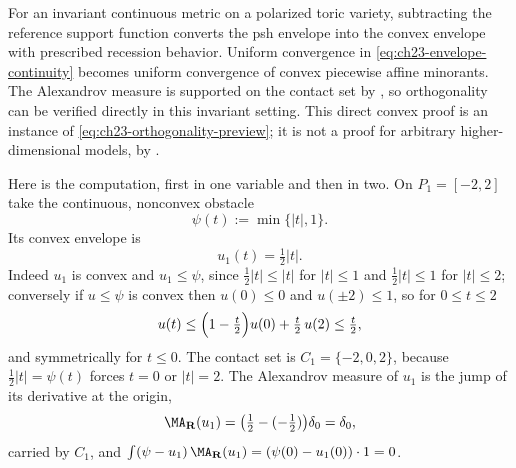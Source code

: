 \begin{example}
\label{ex:ch23-toric-orthogonality}
For an invariant continuous metric on a polarized toric variety, subtracting
the reference support function converts the psh envelope into the convex
envelope with prescribed recession behavior.  Uniform convergence in
\eqref{eq:ch23-envelope-continuity} becomes uniform convergence of convex
piecewise affine minorants.  The Alexandrov measure is supported on the
contact set by , so
orthogonality can be verified directly in this invariant setting.  This
direct convex proof is an instance of
\eqref{eq:ch23-orthogonality-preview}; it is not a proof for arbitrary
higher-dimensional models, by .

Here is the computation, first in one variable and then in two.  On
\(P_1=[-2,2]\) take the continuous, nonconvex obstacle
\[
 \psi(t):=\min\{|t|,1\} .
\]
Its convex envelope is
\[
 u_1(t)=\tfrac12|t| .
\]
Indeed \(u_1\) is convex and \(u_1\leq\psi\), since
\(\tfrac12|t|\leq|t|\) for \(|t|\leq1\) and \(\tfrac12|t|\leq1\) for
\(|t|\leq2\); conversely if \(u\leq\psi\) is convex then \(u(0)\leq0\) and
\(u(\pm2)\leq1\), so for \(0\leq t\leq2\)
\[
 u(t)\leq\Bigl(1-\tfrac t2\Bigr)u(0)+\tfrac t2\,u(2)\leq\tfrac t2 ,
\]
and symmetrically for \(t\leq0\).  The contact set is
\(C_1=\{-2,0,2\}\), because \(\tfrac12|t|=\psi(t)\) forces \(t=0\) or
\(|t|=2\).  The Alexandrov measure of \(u_1\) is the jump of its derivative
at the origin,
\[
 \MA_{\mathbf R}(u_1)=\bigl(\tfrac12-(-\tfrac12)\bigr)\delta_0=\delta_0 ,
\]
carried by \(C_1\), and
\(\int(\psi-u_1)\,\MA_{\mathbf R}(u_1)=(\psi(0)-u_1(0))\cdot1=0\).


\end{example}
